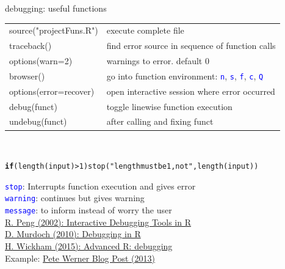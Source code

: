 \documentclass[xcolor=table,           xcolor=dvipsnames]{beamer}\usepackage[]{graphicx}\usepackage[]{color}
\makeatletter
\newcommand{\hlnum}[1]{\textcolor[rgb]{0,0,0}{#1}}
\newcommand{\hlstr}[1]{\textcolor[rgb]{0.545,0.137,0.137}{#1}}
\newcommand{\hlopt}[1]{\textcolor[rgb]{0,0,0}{#1}}
\newcommand{\hlstd}[1]{\textcolor[rgb]{0,0,0}{#1}}
\newcommand{\hlkwa}[1]{\textcolor[rgb]{1,0,0}{\textbf{#1}}}
\newcommand{\hlkwd}[1]{\textcolor[rgb]{0,0,1}{#1}}
\newenvironment{kframe}{%
 \def\at@end@of@kframe{}%
 \ifinner\ifhmode%
  \def\at@end@of@kframe{\end{minipage}}%
  \begin{minipage}{\columnwidth}%
 \fi\fi%
 \def\FrameCommand##1{\hskip\@totalleftmargin \hskip-\fboxsep
 \colorbox{shadecolor}{##1}\hskip-\fboxsep
     \hskip-\linewidth \hskip-\@totalleftmargin \hskip\columnwidth}%
 \MakeFramed {\advance\hsize-\width
   \@totalleftmargin\z@ \linewidth\hsize
   \@setminipage}}%
 {\par\unskip\endMakeFramed%
 \at@end@of@kframe}
\newenvironment{knitrout}{}{} %
\newcommand{\rcode}[1]{\texttt{\textcolor{Blue}{#1}}} %
\makeatother
\begin{document}
\begin{frame}[fragile]{debugging: useful functions}
\begin{tabular}{ll}
\pause source("projectFuns.R") & execute complete file\\
\pause traceback() & find error source in sequence of function calls\\
\pause options(warn=2) & warnings to error. default 0\\
\pause browser() & go into function environment: \rcode{n}, \rcode{s}, \rcode{f}, \rcode{c}, \rcode{Q}\\
\pause \alert{options(error=recover)} & \alert{open interactive session where error occurred}\\
\pause debug(funct) & toggle linewise function execution\\
\pause undebug(funct) & after calling and fixing funct\\
\end{tabular}\\
\pause
\vspace{-0.5em}
\begin{knitrout}\footnotesize
{}\color{fgcolor}\begin{kframe}
\begin{alltt}
\hlkwa{if}\hlstd{(}\hlkwd{length}\hlstd{(input)}\hlopt{>}\hlnum{1}\hlstd{)} \hlkwd{stop}\hlstd{(}\hlstr{"length must be 1, not "}\hlstd{,} \hlkwd{length}\hlstd{(input))}
\end{alltt}
\end{kframe}
\end{knitrout}
\vspace{-1em}
\pause
\rcode{stop}: Interrupts function execution and gives error\\
\rcode{warning}: continues but gives warning\\
\rcode{message}: to inform instead of worry the user\\[1em]
\pause
\href{http://www.biostat.jhsph.edu/~rpeng/docs/R-debug-tools.pdf}{R. Peng (2002): Interactive Debugging Tools in R}\\
\href{http://www.stats.uwo.ca/faculty/murdoch/software/debuggingR/}{D. Murdoch (2010): Debugging in R}\\
\href{http://adv-r.had.co.nz/Exceptions-Debugging.html}{H. Wickham (2015): Advanced R: debugging}\\
Example: \href{https://www.r-bloggers.com/tracking-down-errors-in-r/}{Pete Werner Blog Post (2013)}
\end{frame}
\end{document}
